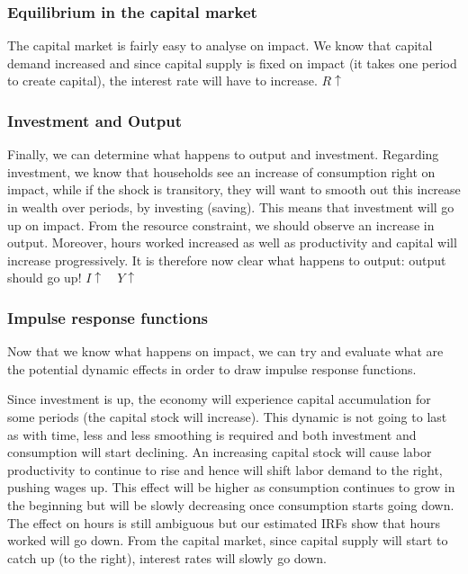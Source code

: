 \documentclass[12pt]{report}
\begin{document}
\subsubsection{Equilibrium in the capital market}

The capital market is fairly easy to analyse on impact. We know that capital demand increased and since capital supply is fixed on impact (it takes one period to create capital), the interest rate will have to increase. $ R\uparrow $

\subsubsection{Investment and Output}

Finally, we can determine what happens to output and investment. Regarding investment, we know that households see an increase of consumption right on impact, while if the shock is transitory, they will want to smooth out this increase in wealth over periods, by investing (saving). This means that investment will go up on impact. From the resource constraint, we should observe an increase in output. Moreover, hours worked increased as well as productivity and capital will increase progressively. It is therefore now clear what happens to output: output should go up! $I\uparrow \quad Y\uparrow $

\subsubsection{Impulse response functions}

Now that we know what happens on impact, we can try and evaluate what are the potential dynamic effects in order to draw impulse response functions.

Since investment is up, the economy will experience capital accumulation for some periods (the capital stock will increase). This dynamic is not going to last as with time, less and less smoothing is required and both investment and consumption will start declining. An increasing capital stock will cause labor productivity to continue to rise and hence will shift labor demand to the right, pushing wages up. This effect will be higher as consumption continues to grow in the beginning but will be slowly decreasing once consumption starts going down. The effect on hours is still ambiguous but our estimated IRFs show that hours worked will go down. From the capital market, since capital supply will start to catch up (to the right), interest rates will slowly go down.
\end{document}
